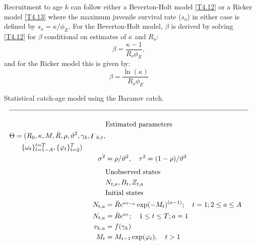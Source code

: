 \begin{multicols}{2}
Recruitment to age $k$ can follow either a Beverton-Holt model \eqref{T4.12} or a Ricker model \eqref{T4.13} where the maximum juvenile survival rate ($s_o$) in either case is defined by $s_o=\kappa/\phi_E$.  For the Beverton-Holt model, $\beta$ is derived by solving \eqref{T4.12} for $\beta$ conditional on estimates of $\kappa$ and $R_o$:
\[
\beta = \frac{\kappa-1}{R_o \phi_E},
\]
and for the Ricker model this is given by:
\[
\beta = \frac{\ln(\kappa)}{R_o \phi_E}
\]

\begin{tablehere}
  \centering
\caption{Statistical catch-age model using the Baranov catch.}
\label{tab:statistical_catch_age_model}
\tableEq
    \begin{align}
        \hline \nonumber \\
        &\mbox{Estimated parameters} \nonumber\\
        \begin{split}
        \Theta&= 
                (R_0,\kappa,M,\bar{R},\rho,\vartheta^2,\gamma_{k},%
                \digamma_{k,t},\\
        &\quad \{\omega_t\}_{t=1-A}^{t=T},
                \{\varphi_t \}_{t=2}^T)
    \end{split} \label{T4.1}\\
        \sigma^2&=\rho /\vartheta^2, \quad
        \tau^2=(1-\rho)/\vartheta^2\label{T4.2}\\[1ex]
        &\mbox{Unobserved states} \nonumber\\
        &N_{t,a},B_t,Z_{t,a}    \label{T4.3}\\
        &\mbox{Initial states} \nonumber\\
        N_{t,a}&=\bar{R}e^{\omega_{t-a}} \exp(-M_t)^{(a-1)};\quad t=1;  2\leq a\leq A \label{T4.4}\\
        N_{t,a}&=\bar{R}e^{\omega_{t}} ;\quad 1\leq t\leq T;  a=1 \label{T4.5}\\
        v_{k,a}&=f(\gamma_k) \label{T4.6}\\
        M_t &= M_{t-1} \exp(\varphi_t), \quad t>1 \label{T4.6b}\\

\end{align}
\end{tablehere}
\end{multicols}
